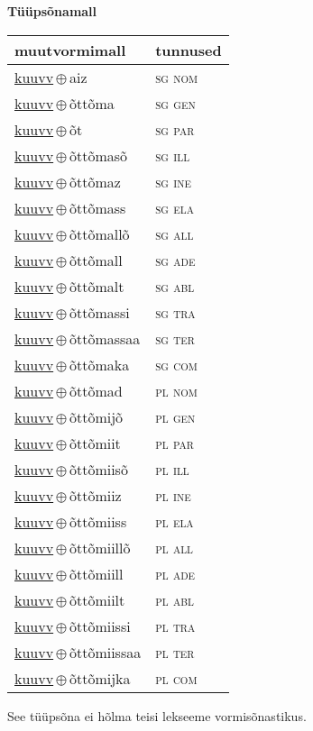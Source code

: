 

\vspace{3.5em}
\noindent \begin{minipage}{\textwidth}
\noindent \textbf{Tüüpsõnamall \,}\\

\begin{sideways}
\begin{tabular}{l l}
muutvormimall & tunnused \\
\hline
\underline{kuuvv}\,$\oplus$\,aiz & \textsc{ sg nom } \\
\underline{kuuvv}\,$\oplus$\,õttõma & \textsc{ sg gen } \\
\underline{kuuvv}\,$\oplus$\,õt & \textsc{ sg par } \\
\underline{kuuvv}\,$\oplus$\,õttõmasõ & \textsc{ sg ill } \\
\underline{kuuvv}\,$\oplus$\,õttõmaz & \textsc{ sg ine } \\
\underline{kuuvv}\,$\oplus$\,õttõmass & \textsc{ sg ela } \\
\underline{kuuvv}\,$\oplus$\,õttõmallõ & \textsc{ sg all } \\
\underline{kuuvv}\,$\oplus$\,õttõmall & \textsc{ sg ade } \\
\underline{kuuvv}\,$\oplus$\,õttõmalt & \textsc{ sg abl } \\
\underline{kuuvv}\,$\oplus$\,õttõmassi & \textsc{ sg tra } \\
\underline{kuuvv}\,$\oplus$\,õttõmassaa & \textsc{ sg ter } \\
\underline{kuuvv}\,$\oplus$\,õttõmaka & \textsc{ sg com } \\
\underline{kuuvv}\,$\oplus$\,õttõmad & \textsc{ pl nom } \\
\underline{kuuvv}\,$\oplus$\,õttõmijõ & \textsc{ pl gen } \\
\underline{kuuvv}\,$\oplus$\,õttõmiit & \textsc{ pl par } \\
\underline{kuuvv}\,$\oplus$\,õttõmiisõ & \textsc{ pl ill } \\
\underline{kuuvv}\,$\oplus$\,õttõmiiz & \textsc{ pl ine } \\
\underline{kuuvv}\,$\oplus$\,õttõmiiss & \textsc{ pl ela } \\
\underline{kuuvv}\,$\oplus$\,õttõmiillõ & \textsc{ pl all } \\
\underline{kuuvv}\,$\oplus$\,õttõmiill & \textsc{ pl ade } \\
\underline{kuuvv}\,$\oplus$\,õttõmiilt & \textsc{ pl abl } \\
\underline{kuuvv}\,$\oplus$\,õttõmiissi & \textsc{ pl tra } \\
\underline{kuuvv}\,$\oplus$\,õttõmiissaa & \textsc{ pl ter } \\
\underline{kuuvv}\,$\oplus$\,õttõmijka & \textsc{ pl com } \\
\end{tabular}
\end{sideways}
\label{tab:tüüpsõnamall-kuuvvaiz}

\end{minipage}

 
\vspace{1em}
\noindent See tüüpsõna ei hõlma teisi lekseeme vormi\-sõnastikus.
